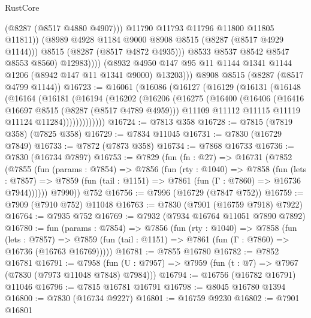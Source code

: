 \begin{lexlean}{RustCore}
\begin{coremodule}
                          (@8287 (@8517 @4880 @4907)))
                        @11790
                        @11793
                        @11796
                        @11800
                        @11805
                        @11811))
                    (@8989 @4928 @1184 @9000 @8908 @8515 (@8287 (@8517 @4929 @1144)))
                    @8515
                    (@8287 (@8517 @4872 @4935)))
                  @8533
                  @8537
                  @8542
                  @8547
                  @8553
                  @8560)
                @12983))))
        (@8932 @4950 @147 @95 @11 @1144 @1341 @1144 @1206 (@8942 @147 @11 @1341 @9000) @13203)))
    @8908
    @8515
    (@8287 (@8517 @4799 @1144))
@16723 := @16061
    (@16086
      (@16127
        (@16129
          (@16131
            (@16148
              (@16164
                (@16181
                  (@16194
                    (@16202
                      (@16206
                        (@16275
                          (@16400
                            (@16406
                              (@16416 @16697 @8515 (@8287 (@8517 @4789 @4959)))
                              @11109
                              @11112
                              @11115
                              @11119
                              @11124
                              @11284)))))))))))))
@16724 := @7813 @358
@16728 := @7815 (@7819 @358) (@7825 @358)
@16729 := @7834 @11045
@16731 := @7830 (@16729 @7849)
@16733 := @7872 (@7873 @358)
@16734 := @7868 @16733
@16736 := @7830 (@16734 @7897)
@16753 := @7829
    (fun (fn : @27) =>
    @16731
      (@7852
        (@7855
          (fun (params : @7854) =>
          @7856
            (fun (rty : @1040) =>
            @7858
              (fun (lets : @7857) =>
              @7859 (fun (tail : @1151) => @7861 (fun (Γ : @7860) => @16736 @7944))))))
        @7990))
    @752
@16756 := @7996 (@16729 (@7847 @752))
@16759 := @7909 (@7910 @752) @11048
@16763 := @7830 (@7901 (@16759 @7918) @7922)
@16764 := @7935 @752
@16769 := @7932 (@7934 @16764 @11051 @7890 @7892)
@16780 := fun (params : @7854) =>
  @7856
    (fun (rty : @1040) =>
    @7858
      (fun (lets : @7857) =>
      @7859 (fun (tail : @1151) => @7861 (fun (Γ : @7860) => @16736 (@16763 @16769)))))
@16781 := @7855 @16780
@16782 := @7852 @16781
@16791 := @7958
    (fun (U : @7957) => @7959 (fun (t : @7) => @7967 (@7830 (@7973 @11048 @7848) @7984)))
@16794 := @16756 (@16782 @16791) @11046
@16796 := @7815 @16781 @16791
@16798 := @8045 @16780 @1394
@16800 := @7830 (@16734 @9227)
@16801 := @16759 @9230
@16802 := @7901 @16801

\end{coremodule}
\end{lexlean}
